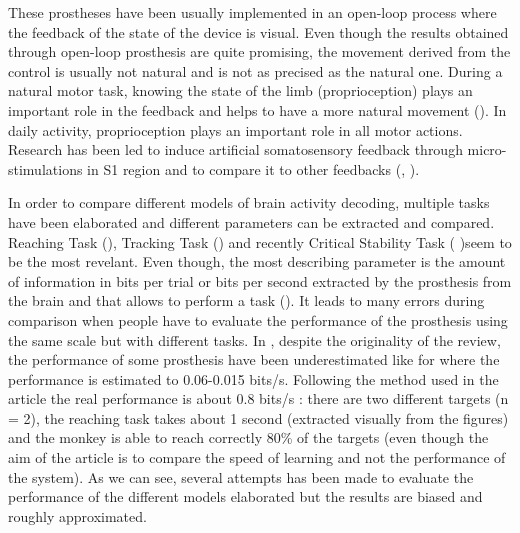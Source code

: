 \documentclass[preprint,12pt]{elsarticle}
\begin{document}
These prostheses have been usually implemented in an open-loop process where the feedback of the state of the device is visual. Even though the results obtained through open-loop prosthesis are quite promising, the movement derived from the control is usually not natural and is not as precised as the natural one. During a natural motor task, knowing the state of the limb (proprioception) plays an important role in the feedback and helps to have a more natural movement (\citet{Scheidt2005}). In daily activity, proprioception plays an important role in all motor actions. Research has been led to induce artificial somatosensory feedback through micro-stimulations in S1 region and to compare it to other feedbacks (\citet{Dadarlat2015}, \citet{Godlove2014}).

In order to compare different models of brain activity decoding, multiple tasks have been elaborated and different parameters can be extracted and compared. Reaching Task (\citet{Kao2015}), Tracking Task (\citet{ODoherty2009}) and recently Critical Stability Task (\citet{Quick2014} )seem to be the most revelant. Even though, the most describing parameter is the amount of information in bits per trial or bits per second extracted by the prosthesis from the brain and that allows to perform a task (\citet{Georgopoulos1988}). It leads to many errors during comparison when people have to evaluate the performance of the prosthesis using the same scale but with different tasks. In \citet{Tehovnik2013}, despite the originality of the review, the performance of some prosthesis have been underestimated like for \citet{ODoherty2009} where the performance is estimated to 0.06-0.015 bits/s. Following the method used in the article the real performance is about 0.8 bits/s : there are two different targets (n = 2), the reaching task takes about 1 second (extracted visually from the figures) and the monkey is able to reach correctly 80\% of the targets (even though the aim of the article is to compare the speed of learning and not the performance of the system). As we can see, several attempts has been made to evaluate the performance of the different models elaborated but the results are biased and roughly approximated.



\end{document}
